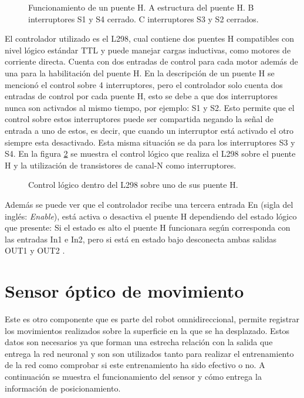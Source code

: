 \documentclass{iccmemoria}
\begin{document}
\begin{figure}[H]
  \centering
  
  \caption[Funcionamiento de un puente H.]{Funcionamiento de un puente H. A estructura del puente H. B interruptores S1 y S4 cerrado. C interruptores S3 y S2 cerrados.}
  \label{fig:H bridge}
\end{figure}

El controlador utilizado es el L298, cual contiene dos puentes H compatibles con nivel lógico estándar TTL y puede manejar cargas inductivas, como motores de corriente directa. Cuenta con dos entradas de control para cada motor además de una para la habilitación del puente H. En la descripción de un puente H se mencionó el control sobre 4 interruptores, pero el controlador solo cuenta dos entradas de control por cada puente H, esto se debe a que dos interruptores nunca son activados al mismo tiempo, por ejemplo: S1 y S2. Esto permite que el control sobre estos interruptores puede ser compartida negando la señal de entrada a uno de estos, es decir, que cuando un interruptor está activado el otro siempre esta desactivado. Esta misma situación se da para los interruptores S3 y S4. En la figura \ref{fig:H bridge circuit} se muestra el control lógico que realiza el L298 sobre el puente H y la utilización de transistores de canal-N  como interruptores.\\

\begin{figure}[H]
  \centering
  \selectfont{
  
  }
  \caption[Control lógico del controlador L298]{Control lógico dentro del L298 sobre uno de sus puente H.}
  \label{fig:H bridge circuit}
\end{figure}

Además se puede ver que el controlador recibe una tercera entrada En (sigla del inglés: \emph{Enable}), está activa o desactiva el puente H dependiendo del estado lógico que presente: Si el estado es alto el puente H funcionara según corresponda con las entradas In1 e In2, pero si está en estado bajo desconecta ambas salidas OUT1 y OUT2 \cite{st:l298}.

\section{Sensor óptico de movimiento}

Este es otro componente que es parte del robot omnidireccional, permite registrar los movimientos realizados sobre la superficie en la que se ha desplazado. Estos datos son necesarios ya que forman una estrecha relación con la salida que entrega la red neuronal y son son utilizados tanto para realizar el entrenamiento de la red como comprobar si este entrenamiento ha sido efectivo o no. A continuación se muestra el funcionamiento del sensor y cómo entrega la información de posicionamiento.\\
\end{document}
